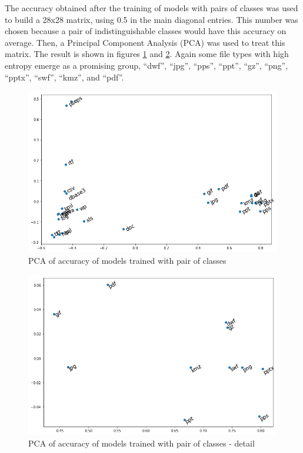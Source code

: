The accuracy obtained after the training of models with pairs of classes was used to build a 28x28 matrix, using 0.5 in the main diagonal entries. This number was chosen because a pair of indistinguishable classes would have this accuracy on average. Then, a Principal Component Analysis (PCA) \cite{amirani_new_2008} was used to treat this matrix. The result is shown in figures \ref{fig:pca} and \ref{fig:pca2}. Again some file types with high entropy emerge as a promising group, ``dwf'',
``jpg'',
``pps'',
``ppt'',
``gz'',
``png'',
``pptx'',
``swf'',
``kmz'',
and ``pdf''.

\noindent
\begin{figure}[htb!]
\centering\includegraphics[width=1.0\textwidth]{content/pca.png}
\caption{\label{fig:pca}PCA of accuracy of models trained with pair of classes}%
\end{figure}


\noindent
\begin{figure}[htb!]
\centering\includegraphics[width=1.0\textwidth]{content/pca2.png}
\caption{\label{fig:pca2}PCA of accuracy of models trained with pair of classes - detail}%
\end{figure}


